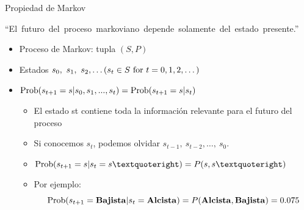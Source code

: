 \documentclass{beamer}
\begin{document}
\begin{frame}{Propiedad de Markov}
\begin{center}
\mbox{\hspace{-0.6cm}“El futuro del proceso markoviano depende solamente del estado presente.”}
\end{center}
\begin{itemize}
\item<2-> Proceso de Markov: tupla $(S,P)$
\item<3-> Estados  $s_0,~s_1,~s_2, \dots (s_t \in S ~{\rm for }~t = 0,1,2,\dots)$
\item<4-> ${\rm Prob}(s_{t+1}=s|s_0,s_1,...,s_t) = {\rm Prob}(s_{t+1}=s|s_t)$
\begin{itemize}
\item<5-> El estado st contiene toda la información relevante para el futuro del proceso
\item<5->Si conocemos $s_t$, podemos olvidar $s_{t-1}, ~s_{t-2},\dots,~s_0$.
\item<6->${\rm Prob}(s_{t+1}= s| s_t= s’) =   P(s,s’)$
\item<7-> Por ejemplo: 
$${\rm Prob}(s_{t+1}= \mathbf{Bajista} | s_t =\mathbf{Alcista}) = P(\mathbf{Alcista}, \mathbf{Bajista}) = 0.075$$
\end{itemize}
\end{itemize}
\end{frame}
\end{document}
